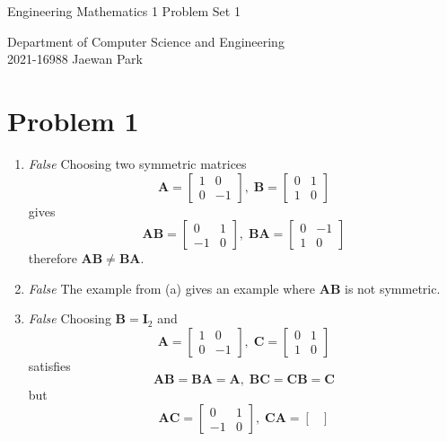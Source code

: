 \documentclass[10pt]{article}
\begin{document}
\begin{center}
    {\LARGE Engineering Mathematics 1 Problem Set 1} \\
\end{center}
\begin{flushright}
    Department of Computer Science and Engineering \\
    2021-16988 Jaewan Park
\end{flushright}

\section*{Problem 1}
\begin{enumerate}[leftmargin=*, label={(\alph*)}]
    \item \textit{False } Choosing two symmetric matrices
    $$\mathbf{A} = \begin{bmatrix}
        1 & 0 \\ 0 & -1
    \end{bmatrix}, \; \mathbf{B} = \begin{bmatrix}
        0 & 1 \\ 1 & 0
    \end{bmatrix}$$
    gives
    $$\mathbf{AB} = \begin{bmatrix}
        0 & 1 \\ -1 & 0
    \end{bmatrix}, \; \mathbf{BA} = \begin{bmatrix}
        0 & -1 \\ 1 & 0
    \end{bmatrix}$$
    therefore $\mathbf{AB} \neq \mathbf{BA}$.
    \item \textit{False } The example from (a) gives an example where $\mathbf{AB}$ is not symmetric.
    \item \textit{False } Choosing $\mathbf{B} = \mathbf{I}_2$ and 
    $$\mathbf{A} = \begin{bmatrix}
        1 & 0 \\ 0 & -1
    \end{bmatrix}, \; \mathbf{C} = \begin{bmatrix}
        0 & 1 \\ 1 & 0
    \end{bmatrix}$$ satisfies
    $$\mathbf{AB} = \mathbf{BA} = \mathbf{A}, \; \mathbf{BC} = \mathbf{CB} = \mathbf{C}$$
    but
    $$\mathbf{AC} = \begin{bmatrix}
        0 & 1 \\ -1 & 0
    \end{bmatrix}, \; \mathbf{CA} = \begin{bmatrix}

\end{bmatrix}$$
\end{enumerate}
\end{document}
